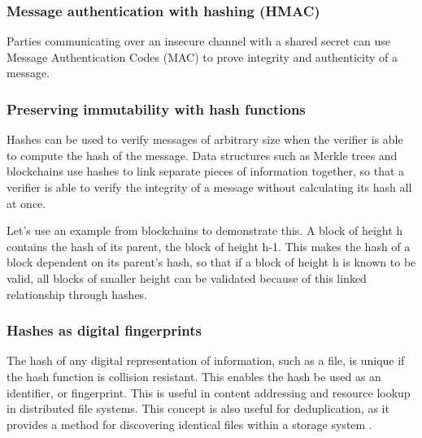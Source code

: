 \subsubsection{Message authentication with hashing (HMAC)}

Parties communicating over an insecure channel with a shared secret can use Message Authentication Codes (MAC) to prove integrity and authenticity of a message. \cite[p.~158--164]{lindell2014introduction}


\subsubsection{Preserving immutability with hash functions}

Hashes can be used to verify messages of arbitrary size when the verifier is able to compute the hash of the message. Data structures such as Merkle trees and blockchains use hashes to link separate pieces of information together, so that a verifier is able to verify the integrity of a message without calculating its hash all at once. 

Let's use an example from blockchains to demonstrate this. A block of height h contains the hash of its parent, the block of height h-1. This makes the hash of a block dependent on its parent's hash, so that if a block of height h is known to be valid, all blocks of smaller height can be validated because of this linked relationship through hashes. 

\subsubsection{Hashes as digital fingerprints}

The hash of any digital representation of information, such as a file, is unique if the hash function is collision resistant. This enables the hash be used as an identifier, or fingerprint. This is useful in content addressing and resource lookup in distributed file systems. This concept is also useful for deduplication, as it provides a method for discovering identical files within a storage system \cite[p.~182-183]{lindell2014introduction}. 

